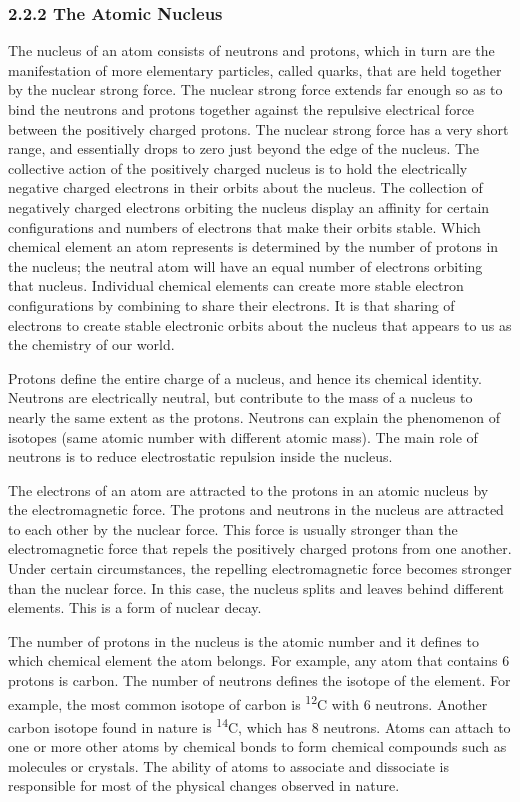 \documentclass[
]{article}
\theoremstyle{definition}
\theoremstyle{definition}
\theoremstyle{definition}
\theoremstyle{remark}
\begin{document}
\hypertarget{the-atomic-nucleus}{%
\subsubsection{\texorpdfstring{{2.2.2} The Atomic
Nucleus}{2.2.2 The Atomic Nucleus}}\label{the-atomic-nucleus}}

The nucleus of an atom consists of neutrons and protons, which in turn
are the manifestation of more elementary particles, called quarks, that
are held together by the nuclear strong force. The nuclear strong force
extends far enough so as to bind the neutrons and protons together
against the repulsive electrical force between the positively charged
protons. The nuclear strong force has a very short range, and
essentially drops to zero just beyond the edge of the nucleus. The
collective action of the positively charged nucleus is to hold the
electrically negative charged electrons in their orbits about the
nucleus. The collection of negatively charged electrons orbiting the
nucleus display an affinity for certain configurations and numbers of
electrons that make their orbits stable. Which chemical element an atom
represents is determined by the number of protons in the nucleus; the
neutral atom will have an equal number of electrons orbiting that
nucleus. Individual chemical elements can create more stable electron
configurations by combining to share their electrons. It is that sharing
of electrons to create stable electronic orbits about the nucleus that
appears to us as the chemistry of our world.

Protons define the entire charge of a nucleus, and hence its chemical
identity. Neutrons are electrically neutral, but contribute to the mass
of a nucleus to nearly the same extent as the protons. Neutrons can
explain the phenomenon of isotopes (same atomic number with different
atomic mass). The main role of neutrons is to reduce electrostatic
repulsion inside the nucleus.

The electrons of an atom are attracted to the protons in an atomic
nucleus by the electromagnetic force. The protons and neutrons in the
nucleus are attracted to each other by the nuclear force. This force is
usually stronger than the electromagnetic force that repels the
positively charged protons from one another. Under certain
circumstances, the repelling electromagnetic force becomes stronger than
the nuclear force. In this case, the nucleus splits and leaves behind
different elements. This is a form of nuclear decay.

The number of protons in the nucleus is the atomic number and it defines
to which chemical element the atom belongs. For example, any atom that
contains 6 protons is carbon. The number of neutrons defines the isotope
of the element. For example, the most common isotope of carbon is
\textsuperscript{12}C with 6 neutrons. Another carbon isotope found in
nature is \textsuperscript{14}C, which has 8 neutrons. Atoms can attach
to one or more other atoms by chemical bonds to form chemical compounds
such as molecules or crystals. The ability of atoms to associate and
dissociate is responsible for most of the physical changes observed in
nature.
\end{document}
